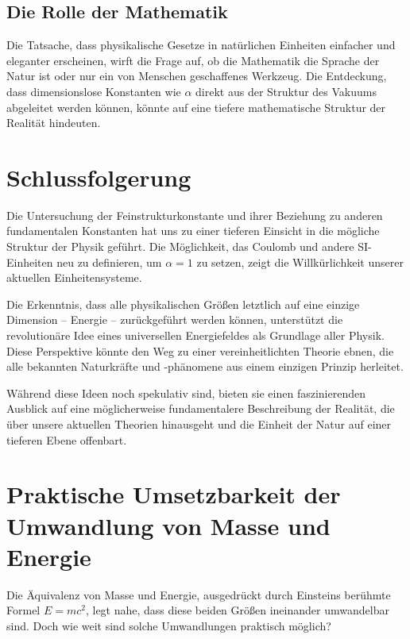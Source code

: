 \documentclass{article}
\begin{document}
	\subsection{Die Rolle der Mathematik}
	
	Die Tatsache, dass physikalische Gesetze in natürlichen Einheiten einfacher und eleganter erscheinen, wirft die Frage auf, ob die Mathematik die Sprache der Natur ist oder nur ein von Menschen geschaffenes Werkzeug. Die Entdeckung, dass dimensionslose Konstanten wie $\alpha$ direkt aus der Struktur des Vakuums abgeleitet werden können, könnte auf eine tiefere mathematische Struktur der Realität hindeuten.
	
	\section{Schlussfolgerung}
	
	Die Untersuchung der Feinstrukturkonstante und ihrer Beziehung zu anderen fundamentalen Konstanten hat uns zu einer tieferen Einsicht in die mögliche Struktur der Physik geführt. Die Möglichkeit, das Coulomb und andere SI-Einheiten neu zu definieren, um $\alpha = 1$ zu setzen, zeigt die Willkürlichkeit unserer aktuellen Einheitensysteme.
	
	Die Erkenntnis, dass alle physikalischen Größen letztlich auf eine einzige Dimension – Energie – zurückgeführt werden können, unterstützt die revolutionäre Idee eines universellen Energiefeldes als Grundlage aller Physik. Diese Perspektive könnte den Weg zu einer vereinheitlichten Theorie ebnen, die alle bekannten Naturkräfte und -phänomene aus einem einzigen Prinzip herleitet.
	
	Während diese Ideen noch spekulativ sind, bieten sie einen faszinierenden Ausblick auf eine möglicherweise fundamentalere Beschreibung der Realität, die über unsere aktuellen Theorien hinausgeht und die Einheit der Natur auf einer tieferen Ebene offenbart.
	\section{Praktische Umsetzbarkeit der Umwandlung von Masse und Energie}
	
	Die Äquivalenz von Masse und Energie, ausgedrückt durch Einsteins berühmte Formel $E = mc^2$, legt nahe, dass diese beiden Größen ineinander umwandelbar sind. Doch wie weit sind solche Umwandlungen praktisch möglich?
	
\end{document}
